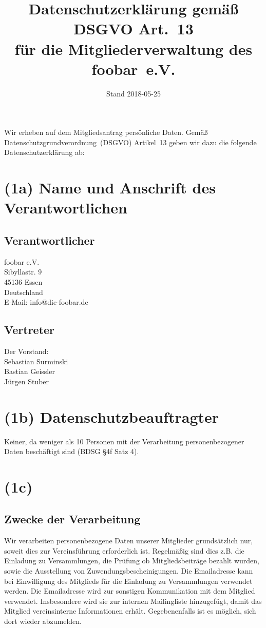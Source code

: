 \documentclass{article}
\title{Datenschutzerklärung gemäß DSGVO Art.~13\\
    für die Mitgliederverwaltung des foobar~e.V.}
\date{Stand 2018-05-25}
\begin{document}
\maketitle

Wir erheben auf dem Mitgliedsantrag persönliche Daten.
Gemäß Datenschutzgrundverordnung~(DSGVO) Artikel~13 geben wir dazu die
folgende Datenschutzerklärung ab:


\section*{(1a) Name und Anschrift des Verantwortlichen}

\subsection*{Verantwortlicher}

foobar e.V.\\
Sibyllastr. 9\\
45136 Essen\\
Deutschland\\[2ex]
E-Mail: info@die-foobar.de


\subsection*{Vertreter}

Der Vorstand:\\[2ex]
Sebastian Surminski\\
Bastian Geissler\\
Jürgen Stuber


\section*{(1b) Datenschutzbeauftragter}

Keiner, da weniger als 10 Personen mit der Verarbeitung
personenbezogener Daten beschäftigt sind (BDSG §4f Satz 4).


\section*{(1c)}

\subsection*{Zwecke der Verarbeitung}

Wir verarbeiten personenbezogene Daten unserer Mitglieder grundsätzlich
nur, soweit dies zur Vereinsführung erforderlich ist.
Regelmäßig sind dies z.B. die Einladung zu Versammlungen,
die Prüfung ob Mitgliedsbeiträge bezahlt wurden,
sowie die Ausstellung von Zuwendungsbescheinigungen.
%
Die Emailadresse kann bei Einwilligung des Mitglieds für die Einladung
zu Versammlungen verwendet werden.
%
Die Emailadresse wird zur sonstigen Kommunikation mit dem Mitglied
verwendet. Insbesondere wird sie zur internen Mailingliste
hinzugefügt, damit das Mitglied vereinsinterne Informationen erhält.
Gegebenenfalls ist es möglich, sich dort wieder abzumelden.
\end{document}
